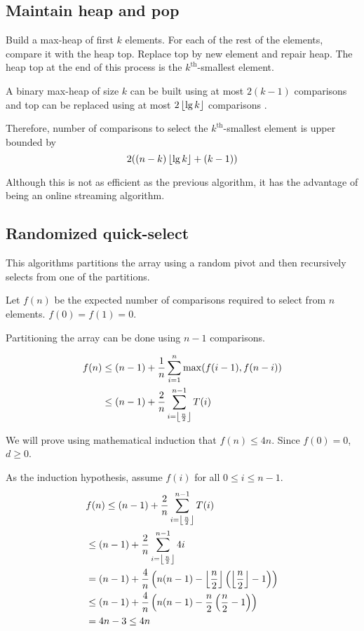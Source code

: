 \subsection{Maintain heap and pop}

Build a max-heap of first $k$ elements.
For each of the rest of the elements, compare it with the heap top.
Replace top by new element and repair heap.
The heap top at the end of this process is the $k^{\textrm{th}}$-smallest element.

A binary max-heap of size $k$ can be built using at most $2(k-1)$ comparisons and top can be replaced
using at most $2\left\lfloor \lg k \right\rfloor$ comparisons \cite{eku-notes:heaps}.

Therefore, number of comparisons to select the $k^{\textrm{th}}$-smallest element is upper bounded by
\[ 2((n-k)\left\lfloor \lg k \right\rfloor + (k-1)) \]

Although this is not as efficient as the previous algorithm,
it has the advantage of being an online streaming algorithm.

\subsection{Randomized quick-select}

This algorithms partitions the array using a random pivot
and then recursively selects from one of the partitions.

Let $f(n)$ be the expected number of comparisons required to select from $n$ elements.
$f(0) = f(1) = 0$.

Partitioning the array can be done using $n-1$ comparisons.

\begin{align*}
f(n) &\le (n-1) + \frac{1}{n} \sum_{i=1}^n \max(f(i-1), f(n-i))
\\ &\le (n-1) + \frac{2}{n} \sum_{i=\left\lfloor \frac{n}{2} \right\rfloor}^{n-1} T(i)
\end{align*}

We will prove using mathematical induction that $f(n) \le 4n$.
Since $f(0) = 0$, $d \ge 0$.

As the induction hypothesis, assume $f(i)$ for all $0 \le i \le n-1$.
\begin{align*}
& f(n) \le (n-1) + \frac{2}{n} \sum_{i=\left\lfloor \frac{n}{2} \right\rfloor}^{n-1} T(i)
\\ &\le (n-1) + \frac{2}{n} \sum_{i=\left\lfloor \frac{n}{2} \right\rfloor}^{n-1} 4i
\\ &= (n-1) + \frac{4}{n} \left( n(n-1) -
\left\lfloor \frac{n}{2} \right\rfloor\left(\left\lfloor \frac{n}{2} \right\rfloor-1\right) \right)
\\ &\le (n-1) + \frac{4}{n} \left( n(n-1) -
\frac{n}{2}\left(\frac{n}{2}-1\right) \right)
\\ &= 4n - 3 \le 4n
\end{align*}

